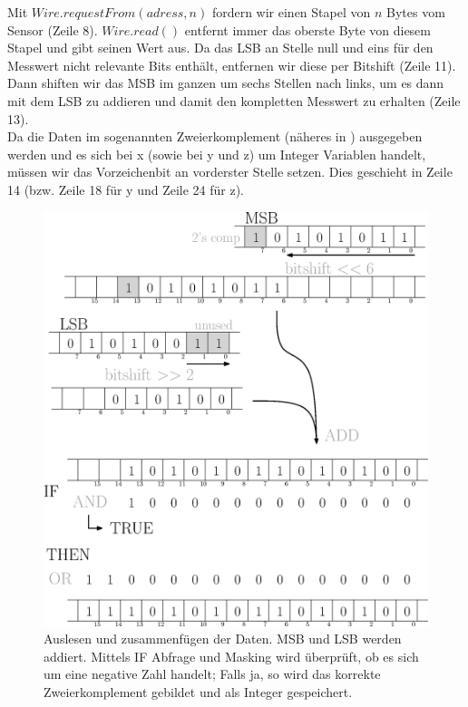 \documentclass[12pt,a4paper]{scrartcl}
\begin{document}
Mit $Wire.requestFrom(adress, n)$ fordern wir einen Stapel von $n$ Bytes vom Sensor (Zeile 8). $Wire.read()$ entfernt immer das oberste Byte von diesem Stapel und gibt seinen Wert aus. Da das LSB an Stelle null und eins für den Messwert nicht relevante Bits enthält, entfernen wir diese per Bitshift (Zeile 11). Dann shiften wir das MSB im ganzen um sechs Stellen nach links, um es dann mit dem LSB zu addieren und damit den kompletten Messwert zu erhalten (Zeile 13).\\

Da die Daten im sogenannten Zweierkomplement (näheres in \citep{Tietze:2002fk}) ausgegeben werden und es sich bei x (sowie bei y und z) um Integer Variablen handelt, müssen wir das Vorzeichenbit an vorderster Stelle setzen. Dies geschieht in Zeile 14 (bzw. Zeile 18 für y und Zeile 24 für z).\\



\begin{figure}[H]
\centering
\includegraphics[scale=.6]{auslesen.eps}
\caption{Auslesen und zusammenfügen der Daten. MSB und LSB werden addiert. Mittels IF Abfrage und Masking wird überprüft, ob es sich um eine negative Zahl handelt; Falls ja, so wird das korrekte Zweierkomplement gebildet und als Integer gespeichert.}
\label{auslesen}
\end{figure}
\end{document}
